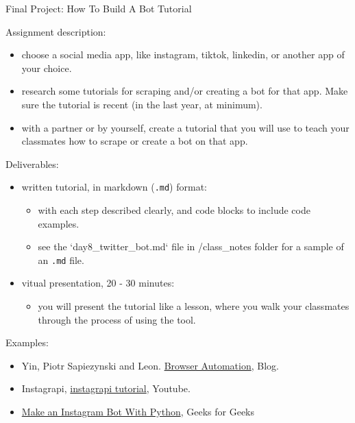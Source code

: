 \documentclass[11pt]{article}
\author{fcalado}
\date{\today}
\title{}
\begin{document}
\tableofcontents

Final Project: How To Build A Bot Tutorial

Assignment description:
\begin{itemize}
\item choose a social media app, like instagram, tiktok, linkedin, or
another app of your choice.
\item research some tutorials for scraping and/or creating a bot for that
app. Make sure the tutorial is recent (in the last year, at
minimum).
\item with a partner or by yourself, create a tutorial that you will use
to teach your classmates how to scrape or create a bot on that app.
\end{itemize}

Deliverables:
\begin{itemize}
\item written tutorial, in markdown (\texttt{.md}) format:
\begin{itemize}
\item with each step described clearly, and code blocks to include code
examples.
\item see the `day8\_twitter\_bot.md` file in /class\_notes folder for a
sample of an \texttt{.md} file.
\end{itemize}
\item vitual presentation, 20 - 30 minutes:
\begin{itemize}
\item you will present the tutorial like a lesson, where you walk your
classmates through the process of using the tool.
\end{itemize}
\end{itemize}

Examples:
\begin{itemize}
\item Yin, Piotr Sapiezynski and Leon. \href{https://inspectelement.org/browser\_automation.html}{Browser Automation}, Blog.
\item Instagrapi, \href{https://www.youtube.com/watch?v=cW7kMeOUr20}{instagrapi tutorial}, Youtube.
\item \href{https://www.geeksforgeeks.org/make-an-instagram-bot-with-python/}{Make an Instagram Bot With Python}, Geeks for Geeks
\end{itemize}
\end{document}
